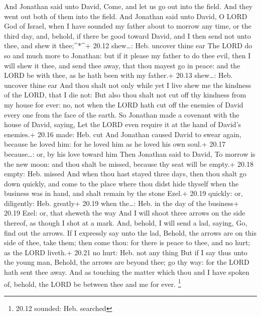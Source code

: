  And Jonathan said unto David, Come, and let us go out into
the field. And they went out both of them into the field. 
And Jonathan said unto David, O LORD God of Israel, when I have sounded
my father about to morrow any time, or the third day, and, behold, if
there be good toward David, and I then send not unto thee, and shew it
thee;\^{}*\^{}+ 20.12 shew\ldots: Heb. uncover thine ear 
The LORD do so and much more to Jonathan: but if it please my father to
do thee evil, then I will shew it thee, and send thee away, that thou
mayest go in peace: and the LORD be with thee, as he hath been with my
father.+ 20.13 shew\ldots: Heb. uncover thine ear  And thou
shalt not only while yet I live shew me the kindness of the LORD, that I
die not:  But also thou shalt not cut off thy kindness from
my house for ever: no, not when the LORD hath cut off the enemies of
David every one from the face of the earth.  So Jonathan
made a covenant with the house of David, saying, Let the LORD even
require it at the hand of David's enemies.+ 20.16 made: Heb. cut
 And Jonathan caused David to swear again, because he loved
him: for he loved him as he loved his own soul.+ 20.17 because\ldots:
or, by his love toward him  Then Jonathan said to David, To
morrow is the new moon: and thou shalt be missed, because thy seat will
be empty.+ 20.18 empty: Heb. missed  And when thou hast
stayed three days, then thou shalt go down quickly, and come to the
place where thou didst hide thyself when the business was in hand, and
shalt remain by the stone Ezel.+ 20.19 quickly: or, diligently: Heb.
greatly+ 20.19 when the\ldots: Heb. in the day of the business+ 20.19
Ezel: or, that sheweth the way  And I will shoot three
arrows on the side thereof, as though I shot at a mark. 
And, behold, I will send a lad, saying, Go, find out the arrows. If I
expressly say unto the lad, Behold, the arrows are on this side of thee,
take them; then come thou: for there is peace to thee, and no hurt; as
the LORD liveth.+ 20.21 no hurt: Heb. not any thing  But if
I say thus unto the young man, Behold, the arrows are beyond thee; go
thy way: for the LORD hath sent thee away.  And as touching
the matter which thou and I have spoken of, behold, the LORD be between
thee and me for ever. \footnote{20.12 sounded: Heb. searched}

